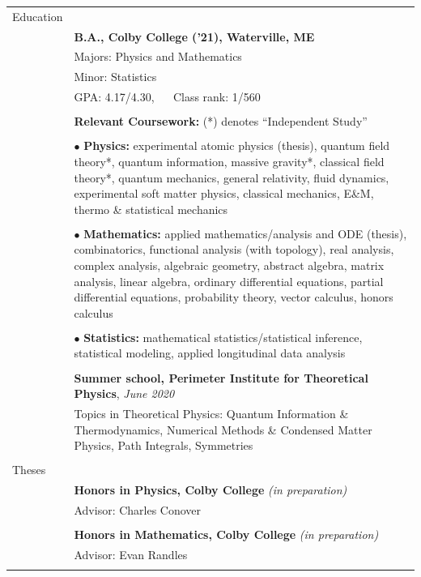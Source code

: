 \documentclass[10pt]{article}
\begin{document}
\noindent \begin{longtable}{ l p{14.7cm}   }

	
  \large{Education}    	& \\ 
  						& \textbf{B.A., Colby College ('21), Waterville, ME} \\
     				 	& Majors: Physics and Mathematics \\
     				 	& Minor: Statistics  \\
     					& GPA: 4.17/4.30, $\quad$ Class rank: 1/560 \\
	 					& \\ 

	 					
	 					& \textbf{Relevant Coursework:} (*) denotes ``Independent Study'' \\ \vspace{-12pt}
	 					& \\
	 					& $\bullet$ \textbf{Physics:} experimental atomic physics (thesis), quantum field theory*, quantum information, massive gravity*, classical field theory*, quantum mechanics,  general relativity, fluid dynamics, experimental soft matter physics, classical mechanics, E\&M, thermo \& statistical mechanics\\  \vspace{-9pt}
	 					& \\
	 					& $\bullet$ \textbf{Mathematics:} applied mathematics/analysis and ODE (thesis), combinatorics, functional analysis (with topology), real analysis, complex analysis, algebraic geometry, abstract algebra, matrix analysis, linear algebra, ordinary differential equations, partial differential equations, probability theory, vector calculus, honors calculus\\   \vspace{-9pt}
	 					& \\ 
	 					& $\bullet$ \textbf{Statistics:} mathematical statistics/statistical inference,  statistical modeling, applied longitudinal data analysis\\
	 					& \\
	 					
	 					
	 					&\textbf{Summer school, Perimeter Institute for Theoretical Physics}, \textit{June 2020} \\
						& Topics in Theoretical Physics: Quantum Information \& Thermodynamics, Numerical Methods \& Condensed Matter Physics, Path Integrals, Symmetries \\
						&\\
						
						
\large{Theses}
&\\
& \textbf{Honors in Physics, Colby College} \textit{(in preparation)}\\
& Advisor: Charles Conover\\
& \\
& \textbf{Honors in Mathematics, Colby College} \textit{(in preparation)}\\
& Advisor: Evan Randles\\
&\\ 
    

\end{longtable}
\end{document}
